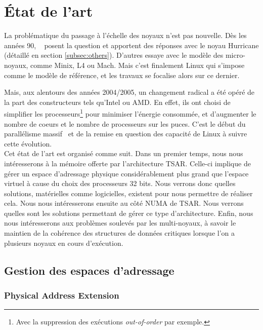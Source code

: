 \chapter{État de l’art}

  La problématique du passage à l’échelle des noyaux n’est pas nouvelle. Dès les
  années 90, ~\citeauthor{unrau1995hierarchical} posent la question et apportent
  des réponses avec le noyau Hurricane (détaillé en section
  \ref{subsec:others}). D’autres essaye avec le modèle des micro-noyaux, comme
  Minix, L4 ou Mach. Mais c'est finalement Linux qui s’impose comme le modèle de
  référence, et les travaux se focalise alors sur ce dernier.

  Mais, aux alentours des années 2004/2005, un changement radical a été opéré de
  la part des constructeurs tels qu’Intel ou AMD. En effet, ils ont choisi de
  simplifier les processeurs\footnote{Avec la suppression des exécutions
    \textit{out-of-order} par exemple.} pour minimiser l'énergie consommée, et
  d'augmenter le nombre de coeurs et le nombre de processeurs sur les
  puces. C'est le début du parallélisme massif~\citep{patterson2011parallel} et
  de la remise en question des capacité de Linux à suivre cette évolution.\\

  Cet état de l'art est organisé comme suit. Dans un premier temps, nous nous
  intéresserons à la mémoire offerte par l'architecture TSAR. Celle-ci implique
  de gérer un espace d'adressage physique considérablement plus grand que
  l'espace virtuel à cause du choix des processeurs 32 bits. Nous verrons donc
  quelles solutions, matérielles comme logicielles, existent pour nous permettre
  de réaliser cela. Nous nous intéresserons ensuite au côté NUMA de TSAR. Nous
  verrons quelles sont les solutions permettant de gérer ce type
  d'architecture. Enfin, nous nous intéresserons aux problèmes soulevés par les
  multi-noyaux, à savoir le maintien de la cohérence des structures de données
  critiques lorsque l'on a plusieurs noyaux en cours d'exécution.


  \section{Gestion des espaces d'adressage}
  \label{sec:memory}    

    \subsection{Physical Address Extension}


